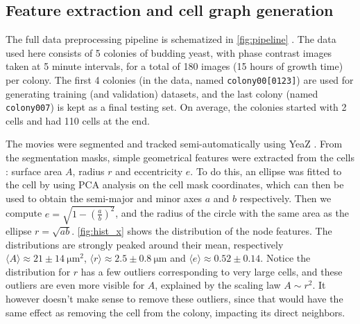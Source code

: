 \documentclass[10pt,conference,compsocconf,a4paper]{IEEEtran}
\newcommand{\nunit}[1]{\ \si{#1}}  %
\newcommand{\avg}[1]{\langle{#1}\rangle}
\newcommand*{\shortautoref}[1]{%
	\begingroup
	\def\equationautorefname{\textsc{Eq.}}%
	\def\tableautorefname{\textsc{Tab.}}%
	\def\figureautorefname{\textsc{Fig.}}%
	\autoref{#1}%
	\endgroup
}
\begin{document}
	\subsection{Feature extraction and cell graph generation}

		The full data preprocessing pipeline is schematized in \shortautoref{fig:pipeline}. The data used here consists of 5 colonies of budding yeast, with phase contrast images taken at 5 minute intervals, for a total of 180 images (15 hours of growth time) per colony. The first 4 colonies (in the data, named \texttt{colony00[0123]}) are used for generating training (and validation) datasets, and the last colony (named \texttt{colony007}) is kept as a final testing set. On average, the colonies started with 2 cells and had 110 cells at the end.

		The movies were segmented and tracked semi-automatically using YeaZ \cite{dietler_convolutional_2020}. From the segmentation masks, simple geometrical features were extracted from the cells : surface area $A$, radius $r$ and eccentricity $e$. To do this, an ellipse was fitted to the cell by using PCA analysis on the cell mask coordinates, which can then be used to obtain the semi-major and minor axes $a$ and $b$ respectively. Then we compute $e=\sqrt{1-(\frac{a}{b})^2}$, and the radius of the circle with the same area as the ellipse $r=\sqrt{ab}$. \shortautoref{fig:hist_x} shows the distribution of the node features. The distributions are strongly peaked around their mean, respectively $\avg{A} \approx 21 \pm 14 \nunit{\micro \meter \squared}$, $\avg{r} \approx 2.5 \pm 0.8 \nunit{\micro \meter}$ and $\avg{e} \approx 0.52 \pm 0.14$. Notice the distribution for $r$ has a few outliers corresponding to very large cells, and these outliers are even more visible for $A$, explained by the scaling law $A \sim r^2$. It however doesn't make sense to remove these outliers, since that would have the same effect as removing the cell from the colony, impacting its direct neighbors.
\end{document}

